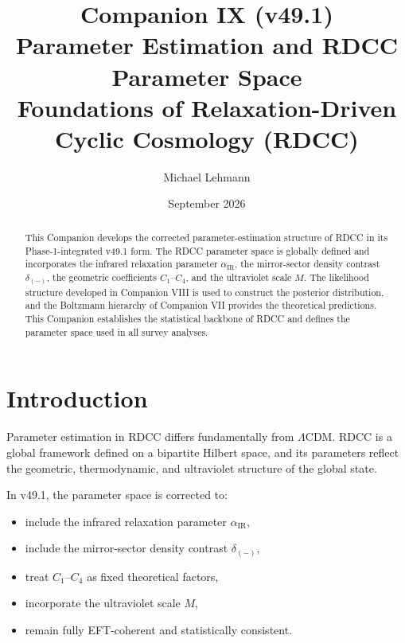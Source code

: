 \documentclass[11pt,a4paper]{article}
\title{\textbf{Companion IX (v49.1)}\\[0.2cm]
\textbf{Parameter Estimation and RDCC Parameter Space}\\[0.2cm]
\large Foundations of Relaxation-Driven Cyclic Cosmology (RDCC)}
\author[1]{Michael Lehmann}
\affil[1]{\small Independent Researcher, Relaxation-Driven Cyclic Cosmology (RDCC)\\
\texttt{mi.lehmann@gmx.de}}
\date{September 2026}
\begin{document}
\maketitle


\begin{abstract}
This Companion develops the corrected parameter-estimation structure of RDCC in
its Phase-1-integrated v49.1 form. The RDCC parameter space is globally defined
and incorporates the infrared relaxation parameter $\alpha_{\mathrm{IR}}$, the
mirror-sector density contrast $\delta_{(-)}$, the geometric coefficients
$C_1$–$C_4$, and the ultraviolet scale $M$. The likelihood structure developed
in Companion VIII is used to construct the posterior distribution, and the
Boltzmann hierarchy of Companion VII provides the theoretical predictions. This
Companion establishes the statistical backbone of RDCC and defines the
parameter space used in all survey analyses.
\end{abstract}

\tableofcontents
\newpage

\section{Introduction}

Parameter estimation in RDCC differs fundamentally from $\Lambda$CDM. RDCC is a
global framework defined on a bipartite Hilbert space, and its parameters
reflect the geometric, thermodynamic, and ultraviolet structure of the global
state.

In v49.1, the parameter space is corrected to:
\begin{itemize}[leftmargin=0.8cm]
  \item include the infrared relaxation parameter $\alpha_{\mathrm{IR}}$,
  \item include the mirror-sector density contrast $\delta_{(-)}$,
  \item treat $C_1$–$C_4$ as fixed theoretical factors,
  \item incorporate the ultraviolet scale $M$,
  \item remain fully EFT-coherent and statistically consistent.
\end{itemize}
\end{document}
